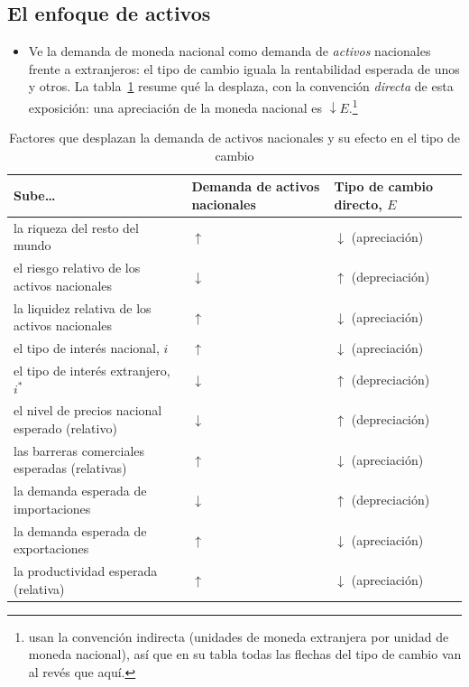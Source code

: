 \documentclass[11pt]{article}
\begin{document}
\subsection{El enfoque de activos}

\begin{itemize}
\item Ve la demanda de moneda nacional como demanda de \emph{activos} nacionales frente a extranjeros: el tipo de cambio iguala la rentabilidad esperada de unos y otros. La tabla~\ref{tab:mishkin} resume qué la desplaza, con la convención \emph{directa} de esta exposición: una apreciación de la moneda nacional es $\downarrow E$.\footnote{\textcite{MishkinMatthewsGiuliodori2013} usan la convención indirecta (unidades de moneda extranjera por unidad de moneda nacional), así que en su tabla todas las flechas del tipo de cambio van al revés que aquí.}
\end{itemize}

\begin{table}[H]
\centering
\caption{Factores que desplazan la demanda de activos nacionales y su efecto en el tipo de cambio}\label{tab:mishkin}
\small
\begin{tabular}{>{\raggedright\arraybackslash}m{5.2cm}>{\centering\arraybackslash}m{3.2cm}>{\centering\arraybackslash}m{3.4cm}}
\toprule
\rowcolor{tceeazulpalido}\textbf{Sube…} & \textbf{Demanda de activos nacionales} & \textbf{Tipo de cambio directo, $E$}\\
\midrule
la riqueza del resto del mundo & $\uparrow$ & \textcolor{tceeverde}{$\downarrow$ (apreciación)}\\
el riesgo relativo de los activos nacionales & $\downarrow$ & \textcolor{tceerojo}{$\uparrow$ (depreciación)}\\
la liquidez relativa de los activos nacionales & $\uparrow$ & \textcolor{tceeverde}{$\downarrow$ (apreciación)}\\
el tipo de interés nacional, $i$ & $\uparrow$ & \textcolor{tceeverde}{$\downarrow$ (apreciación)}\\
el tipo de interés extranjero, $i^{*}$ & $\downarrow$ & \textcolor{tceerojo}{$\uparrow$ (depreciación)}\\
el nivel de precios nacional esperado (relativo) & $\downarrow$ & \textcolor{tceerojo}{$\uparrow$ (depreciación)}\\
las barreras comerciales esperadas (relativas) & $\uparrow$ & \textcolor{tceeverde}{$\downarrow$ (apreciación)}\\
la demanda esperada de importaciones & $\downarrow$ & \textcolor{tceerojo}{$\uparrow$ (depreciación)}\\
la demanda esperada de exportaciones & $\uparrow$ & \textcolor{tceeverde}{$\downarrow$ (apreciación)}\\
la productividad esperada (relativa) & $\uparrow$ & \textcolor{tceeverde}{$\downarrow$ (apreciación)}\\
\bottomrule
\end{tabular}
\end{table}
\end{document}
